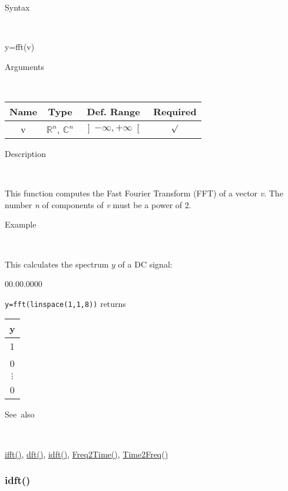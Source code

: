\begin{description}
\item [Syntax]~
\end{description}
y=fft(v)

\begin{description}
\item [Arguments]~
\end{description}
\begin{tabular}{|c|c|c|c|}
\hline 
Name&
Type&
Def. Range&
Required\tabularnewline
\hline
\hline 
v&
$\mathbb{R}^{n}$, $\mathbb{C}^{n}$&
$\left]-\infty,+\infty\right[$&
$\surd$\tabularnewline
\hline 
\end{tabular}

\begin{description}
\item [Description]~
\end{description}
This function computes the Fast Fourier Transform (FFT) of a vector
\textit{v}. The number \textit{n} of components of \textit{v} must be
a power of 2.

\begin{description}
\item [Example]~
\end{description}
This calculates the spectrum $y$ of a DC signal:

\begin{lyxlist}{00.00.0000}
\item [\texttt{y=fft(linspace(1,1,8))}]returns \begin{tabular}{|c|}
\hline 
y\tabularnewline
\hline
\hline 
1\tabularnewline
\hline 
0\tabularnewline
\hline 
$\vdots$\tabularnewline
\hline 
0\tabularnewline
\hline
\end{tabular}
\end{lyxlist}
\begin{description}
\item [See~also]~
\end{description}
\textcolor{blue}{\hyperlink{ifft}{ifft()}}\textcolor{black}{,} \textcolor{blue}{\hyperlink{dft}{dft()}}\textcolor{black}{,}
\textcolor{blue}{\hyperlink{idft}{idft()}}\textcolor{black}{,}
\textcolor{blue}{\hyperlink{Freq2Time}{Freq2Time()}}\textcolor{black}{,}
\textcolor{blue}{\hyperlink{Time2Freq}{Time2Freq()}}


\newpage
\subsubsection*{\hypertarget{idft}{}{\Large idft()}}



